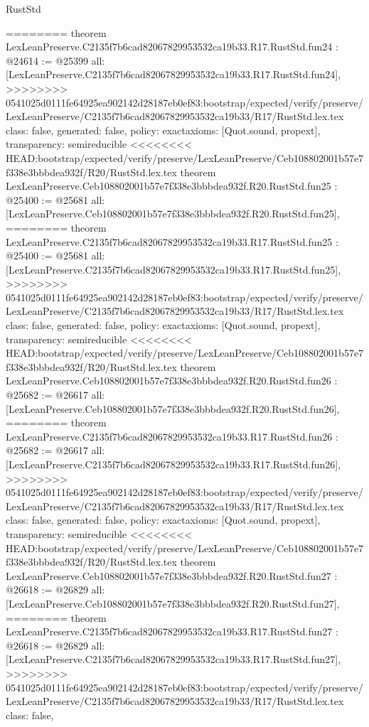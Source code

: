 \begin{lexlean}{RustStd}
\begin{coremodule}
{\begin{coremodule}
{{{{{{{{{{{{{{{{{{{{{{{{{{{========
theorem LexLeanPreserve.C2135f7b6cad82067829953532ca19b33.R17.RustStd.fun24 : @24614 := @25399 {
  all: [LexLeanPreserve.C2135f7b6cad82067829953532ca19b33.R17.RustStd.fun24],
>>>>>>>> 0541025d0111fe64925ea902142d28187eb0ef83:bootstrap/expected/verify/preserve/LexLeanPreserve/C2135f7b6cad82067829953532ca19b33/R17/RustStd.lex.tex
  class: false,
  generated: false,
  policy: exact{axioms: [Quot.sound, propext]},
  transparency: semireducible
}
<<<<<<<< HEAD:bootstrap/expected/verify/preserve/LexLeanPreserve/Ceb108802001b57e7f338e3bbbdea932f/R20/RustStd.lex.tex
theorem LexLeanPreserve.Ceb108802001b57e7f338e3bbbdea932f.R20.RustStd.fun25 : @25400 := @25681 {
  all: [LexLeanPreserve.Ceb108802001b57e7f338e3bbbdea932f.R20.RustStd.fun25],
========
theorem LexLeanPreserve.C2135f7b6cad82067829953532ca19b33.R17.RustStd.fun25 : @25400 := @25681 {
  all: [LexLeanPreserve.C2135f7b6cad82067829953532ca19b33.R17.RustStd.fun25],
>>>>>>>> 0541025d0111fe64925ea902142d28187eb0ef83:bootstrap/expected/verify/preserve/LexLeanPreserve/C2135f7b6cad82067829953532ca19b33/R17/RustStd.lex.tex
  class: false,
  generated: false,
  policy: exact{axioms: [Quot.sound, propext]},
  transparency: semireducible
}
<<<<<<<< HEAD:bootstrap/expected/verify/preserve/LexLeanPreserve/Ceb108802001b57e7f338e3bbbdea932f/R20/RustStd.lex.tex
theorem LexLeanPreserve.Ceb108802001b57e7f338e3bbbdea932f.R20.RustStd.fun26 : @25682 := @26617 {
  all: [LexLeanPreserve.Ceb108802001b57e7f338e3bbbdea932f.R20.RustStd.fun26],
========
theorem LexLeanPreserve.C2135f7b6cad82067829953532ca19b33.R17.RustStd.fun26 : @25682 := @26617 {
  all: [LexLeanPreserve.C2135f7b6cad82067829953532ca19b33.R17.RustStd.fun26],
>>>>>>>> 0541025d0111fe64925ea902142d28187eb0ef83:bootstrap/expected/verify/preserve/LexLeanPreserve/C2135f7b6cad82067829953532ca19b33/R17/RustStd.lex.tex
  class: false,
  generated: false,
  policy: exact{axioms: [Quot.sound, propext]},
  transparency: semireducible
}
<<<<<<<< HEAD:bootstrap/expected/verify/preserve/LexLeanPreserve/Ceb108802001b57e7f338e3bbbdea932f/R20/RustStd.lex.tex
theorem LexLeanPreserve.Ceb108802001b57e7f338e3bbbdea932f.R20.RustStd.fun27 : @26618 := @26829 {
  all: [LexLeanPreserve.Ceb108802001b57e7f338e3bbbdea932f.R20.RustStd.fun27],
========
theorem LexLeanPreserve.C2135f7b6cad82067829953532ca19b33.R17.RustStd.fun27 : @26618 := @26829 {
  all: [LexLeanPreserve.C2135f7b6cad82067829953532ca19b33.R17.RustStd.fun27],
>>>>>>>> 0541025d0111fe64925ea902142d28187eb0ef83:bootstrap/expected/verify/preserve/LexLeanPreserve/C2135f7b6cad82067829953532ca19b33/R17/RustStd.lex.tex
  class: false,
}}}}}}}}}}}}}}}}}}}}}}}}}}}}}}}
\end{coremodule}}
\end{coremodule}
\end{lexlean}
